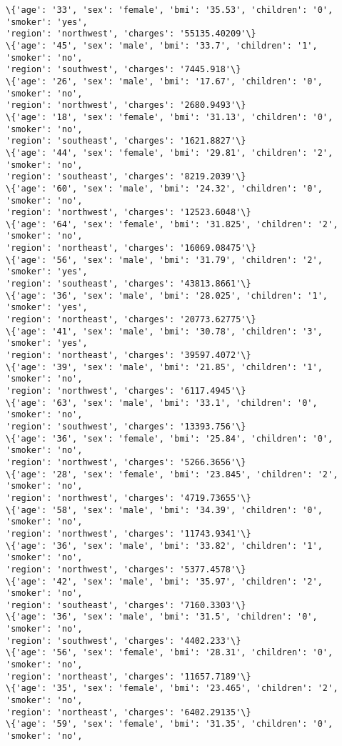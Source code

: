 \documentclass[11pt]{article}
\begin{document}
\begin{Verbatim}[commandchars=\\\{\}]
\{'age': '33', 'sex': 'female', 'bmi': '35.53', 'children': '0', 'smoker': 'yes',
'region': 'northwest', 'charges': '55135.40209'\}
\{'age': '45', 'sex': 'male', 'bmi': '33.7', 'children': '1', 'smoker': 'no',
'region': 'southwest', 'charges': '7445.918'\}
\{'age': '26', 'sex': 'male', 'bmi': '17.67', 'children': '0', 'smoker': 'no',
'region': 'northwest', 'charges': '2680.9493'\}
\{'age': '18', 'sex': 'female', 'bmi': '31.13', 'children': '0', 'smoker': 'no',
'region': 'southeast', 'charges': '1621.8827'\}
\{'age': '44', 'sex': 'female', 'bmi': '29.81', 'children': '2', 'smoker': 'no',
'region': 'southeast', 'charges': '8219.2039'\}
\{'age': '60', 'sex': 'male', 'bmi': '24.32', 'children': '0', 'smoker': 'no',
'region': 'northwest', 'charges': '12523.6048'\}
\{'age': '64', 'sex': 'female', 'bmi': '31.825', 'children': '2', 'smoker': 'no',
'region': 'northeast', 'charges': '16069.08475'\}
\{'age': '56', 'sex': 'male', 'bmi': '31.79', 'children': '2', 'smoker': 'yes',
'region': 'southeast', 'charges': '43813.8661'\}
\{'age': '36', 'sex': 'male', 'bmi': '28.025', 'children': '1', 'smoker': 'yes',
'region': 'northeast', 'charges': '20773.62775'\}
\{'age': '41', 'sex': 'male', 'bmi': '30.78', 'children': '3', 'smoker': 'yes',
'region': 'northeast', 'charges': '39597.4072'\}
\{'age': '39', 'sex': 'male', 'bmi': '21.85', 'children': '1', 'smoker': 'no',
'region': 'northwest', 'charges': '6117.4945'\}
\{'age': '63', 'sex': 'male', 'bmi': '33.1', 'children': '0', 'smoker': 'no',
'region': 'southwest', 'charges': '13393.756'\}
\{'age': '36', 'sex': 'female', 'bmi': '25.84', 'children': '0', 'smoker': 'no',
'region': 'northwest', 'charges': '5266.3656'\}
\{'age': '28', 'sex': 'female', 'bmi': '23.845', 'children': '2', 'smoker': 'no',
'region': 'northwest', 'charges': '4719.73655'\}
\{'age': '58', 'sex': 'male', 'bmi': '34.39', 'children': '0', 'smoker': 'no',
'region': 'northwest', 'charges': '11743.9341'\}
\{'age': '36', 'sex': 'male', 'bmi': '33.82', 'children': '1', 'smoker': 'no',
'region': 'northwest', 'charges': '5377.4578'\}
\{'age': '42', 'sex': 'male', 'bmi': '35.97', 'children': '2', 'smoker': 'no',
'region': 'southeast', 'charges': '7160.3303'\}
\{'age': '36', 'sex': 'male', 'bmi': '31.5', 'children': '0', 'smoker': 'no',
'region': 'southwest', 'charges': '4402.233'\}
\{'age': '56', 'sex': 'female', 'bmi': '28.31', 'children': '0', 'smoker': 'no',
'region': 'northeast', 'charges': '11657.7189'\}
\{'age': '35', 'sex': 'female', 'bmi': '23.465', 'children': '2', 'smoker': 'no',
'region': 'northeast', 'charges': '6402.29135'\}
\{'age': '59', 'sex': 'female', 'bmi': '31.35', 'children': '0', 'smoker': 'no',

\end{Verbatim}
\end{document}
